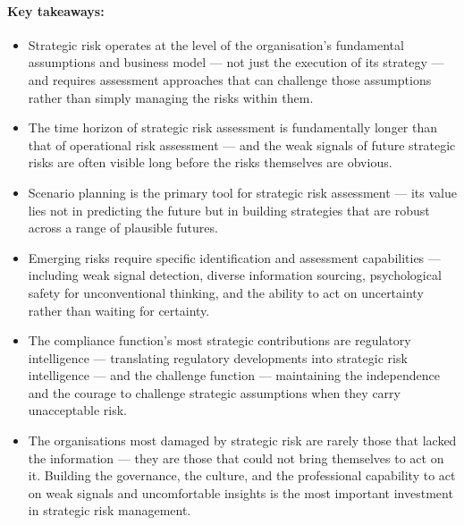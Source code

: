 \paragraph{Key takeaways:}
\begin{itemize}
  \item{Strategic risk operates at the level of the organisation's fundamental assumptions and business model — not just the execution of its strategy — and requires assessment approaches that can challenge those assumptions rather than simply managing the risks within them.}
  \item{The time horizon of strategic risk assessment is fundamentally longer than that of operational risk assessment — and the weak signals of future strategic risks are often visible long before the risks themselves are obvious.}
  \item{Scenario planning is the primary tool for strategic risk assessment — its value lies not in predicting the future but in building strategies that are robust across a range of plausible futures.}
  \item{Emerging risks require specific identification and assessment capabilities — including weak signal detection, diverse information sourcing, psychological safety for unconventional thinking, and the ability to act on uncertainty rather than waiting for certainty.}
  \item{The compliance function's most strategic contributions are regulatory intelligence — translating regulatory developments into strategic risk intelligence — and the challenge function — maintaining the independence and the courage to challenge strategic assumptions when they carry unacceptable risk.}
  \item{The organisations most damaged by strategic risk are rarely those that lacked the information — they are those that could not bring themselves to act on it. Building the governance, the culture, and the professional capability to act on weak signals and uncomfortable insights is the most important investment in strategic risk management.}
\end{itemize}


